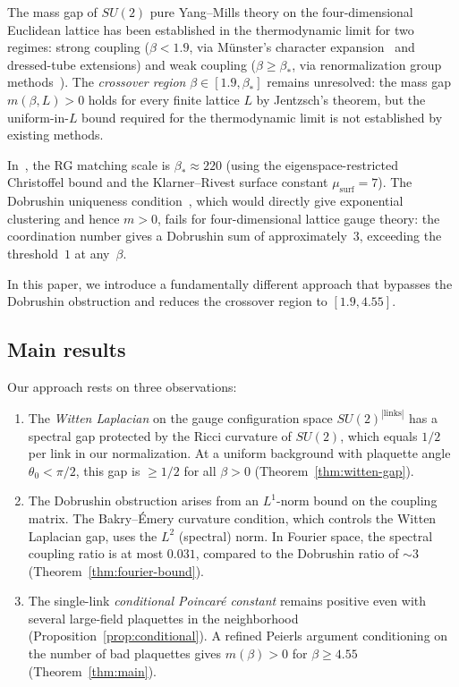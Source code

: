 \documentclass[11pt,a4paper]{article}
\theoremstyle{plain}
\theoremstyle{definition}
\theoremstyle{remark}
\begin{document}
The mass gap of $SU(2)$ pure Yang--Mills theory on the
four-dimensional Euclidean lattice has been established
in the thermodynamic limit for two regimes: strong coupling
($\beta < 1.9$, via M\"unster's character expansion~\cite{Munster1981}
and dressed-tube extensions) and weak coupling
($\beta \geq \beta_*$, via renormalization group methods~\cite{Fontes2026}).
The \emph{crossover region} $\beta \in [1.9, \beta_*]$ remains
unresolved: the mass gap $m(\beta, L) > 0$ holds for every
finite lattice $L$ by Jentzsch's theorem, but the uniform-in-$L$
bound required for the thermodynamic limit is not established
by existing methods.

In~\cite{Fontes2026}, the RG matching scale is $\beta_* \approx 220$
(using the eigenspace-restricted Christoffel bound and the
Klarner--Rivest surface constant $\mu_{\mathrm{surf}} = 7$).
The Dobrushin uniqueness condition~\cite{Dobrushin1968}, which
would directly give exponential clustering and hence $m > 0$, fails
for four-dimensional lattice gauge theory: the coordination number
gives a Dobrushin sum of approximately~$3$, exceeding the
threshold~$1$ at any~$\beta$.

In this paper, we introduce a fundamentally different approach
that bypasses the Dobrushin obstruction and reduces the crossover
region to $[1.9, 4.55]$.

\subsection{Main results}

Our approach rests on three observations:

\begin{enumerate}[label=(\roman*)]
\item The \emph{Witten Laplacian} on the gauge configuration
  space $SU(2)^{|\text{links}|}$ has a spectral gap protected by
  the Ricci curvature of $SU(2)$, which equals $1/2$ per link
  in our normalization.
  At a uniform background with plaquette angle $\theta_0 < \pi/2$,
  this gap is $\geq 1/2$ for all $\beta > 0$
  (Theorem~\ref{thm:witten-gap}).

\item The Dobrushin obstruction arises from an $L^1$-norm bound
  on the coupling matrix. The Bakry--\'Emery curvature condition,
  which controls the Witten Laplacian gap, uses the $L^2$ (spectral)
  norm. In Fourier space, the spectral coupling ratio is at most
  $0.031$, compared to the Dobrushin ratio of $\sim 3$
  (Theorem~\ref{thm:fourier-bound}).

\item The single-link \emph{conditional Poincar\'e constant}
  remains positive even with several large-field plaquettes in
  the neighborhood (Proposition~\ref{prop:conditional}).
  A refined Peierls argument conditioning on the number of
  bad plaquettes gives $m(\beta) > 0$ for $\beta \geq 4.55$
  (Theorem~\ref{thm:main}).
\end{enumerate}
\end{document}
